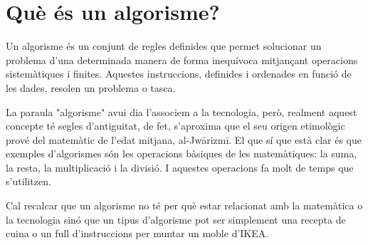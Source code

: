 \section{Què és un algorisme?}


Un algorisme és un conjunt de regles definides que permet solucionar un problema d'una determinada manera de forma inequívoca mitjançant operacions sistemàtiques i finites. Aquestes instruccions, definides i ordenades en funció de les dades, resolen un problema o tasca. \newline

La paraula "algorisme" avui dia l'associem a la tecnologia, però, realment aquest concepte té segles d'antiguitat, de fet, s'aproxima que el seu origen etimològic prové del matemàtic de l'edat mitjana, al-Jwārizmī. El que sí que està clar és que exemples d'algorismes són les operacions bàsiques de les matemàtiques: la suma, la resta, la multiplicació i la divisió. I aquestes operacions fa molt de temps que s'utilitzen. \newline

Cal recalcar que un algorisme no té per què estar relacionat amb la matemàtica o la tecnologia sinó que un tipus d'algorisme pot ser simplement una recepta de cuina o un full d'instruccions per muntar un moble d'IKEA.